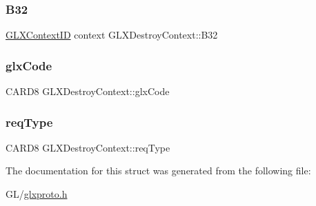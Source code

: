 \subsubsection{\texorpdfstring{B32}{B32}}
{\footnotesize\ttfamily \hyperlink{glx_8h_a17c7ca5b76cc448032df0b5352803005}{G\+L\+X\+Context\+ID} context G\+L\+X\+Destroy\+Context\+::\+B32}

\mbox{\label{struct_g_l_x_destroy_context_ab916c49b3bda94a7c7399c60147a8a33}} 
\subsubsection{\texorpdfstring{glx\+Code}{glxCode}}
{\footnotesize\ttfamily C\+A\+R\+D8 G\+L\+X\+Destroy\+Context\+::glx\+Code}

\mbox{\label{struct_g_l_x_destroy_context_ad69f27a1810249465c5105e81fa5b1fb}} 
\subsubsection{\texorpdfstring{req\+Type}{reqType}}
{\footnotesize\ttfamily C\+A\+R\+D8 G\+L\+X\+Destroy\+Context\+::req\+Type}



The documentation for this struct was generated from the following file\+:\begin{DoxyCompactItemize}
\item 
G\+L/\hyperlink{glxproto_8h}{glxproto.\+h}\end{DoxyCompactItemize}
